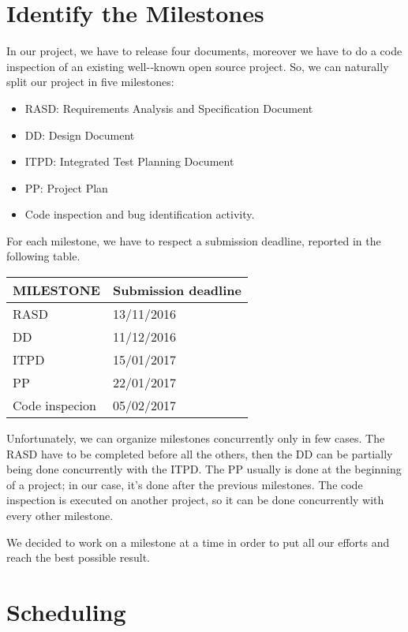 \section{Identify the Milestones}
In our project, we have to release four documents, moreover we have to do a code inspection of an existing well-­‐known open source project. So, we can naturally split our project in five milestones:
\begin{itemize}
	\item RASD: Requirements Analysis and Specification Document
	\item DD: Design Document
	\item ITPD: Integrated Test Planning Document
	\item PP: Project Plan
	\item Code inspection and bug identification activity.
\end{itemize}

For each milestone, we have to respect a submission deadline, reported in the following table.
\begin{center}
  \begin{tabular}{ l | l }%
   	\hline
	\textbf{MILESTONE} & \textbf{Submission deadline} 
   	\\ \hline
    RASD & 13/11/2016
    \\\hline
    DD & 11/12/2016
    \\\hline
    ITPD & 15/01/2017
    \\\hline
    PP & 22/01/2017
 	\\\hline
 	Code inspecion & 05/02/2017
   	\\\hline 
  \end{tabular}
\end{center}

Unfortunately, we can organize milestones concurrently only in few cases. The RASD have to be completed before all the others, then the DD can be partially being done concurrently with the ITPD. The PP usually is done at the beginning of a project; in our case, it's done after the previous milestones. The code inspection is executed on another project, so it can be done concurrently with every other milestone.

We decided to work on a milestone at a time in order to put all our efforts and reach the best possible result.

\newpage
\section{Scheduling}

